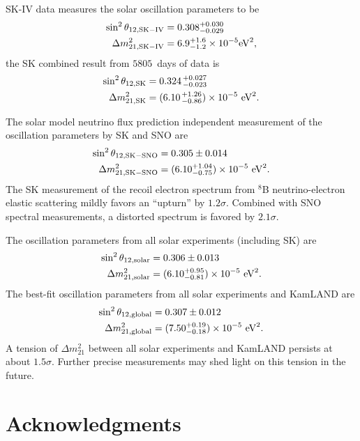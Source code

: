 \documentclass[aps,prd,reprint,superscriptaddress,floatfix,altaffilletter,nofootinbib]{revtex4-2}
\begin{document}
SK-IV data measures the solar oscillation parameters to be
\begin{align*}
    \sin^2\theta_{12,\rm{SK-IV}} & =0.308^{+0.030}_{-0.029}\\
    \Delta m^2_{21,\rm{SK-IV}}   & =6.9^{+1.6}_{-1.2}\times10^{-5}\rm{eV}^2,
\end{align*}
the SK combined result from $5805$~days of data is
\begin{align*}
  \sin^2\theta_{12,\rm{SK}} & = 0.324^{\, +0.027}_{\, -0.023} \\
  \Delta m^{2}_{21,\rm{SK}} & = (6.10 ^{\, +1.26}_{\, -0.86}) \times 10^{-5}~\rm{eV}^{2}.
\end{align*}

The solar model neutrino flux prediction independent measurement of the oscillation parameters by SK and SNO are
\begin{align*}
    \sin^2 \theta_{12,\rm{SK-SNO}} & = 0.305 \pm 0.014 \\
    \Delta m^{2}_{21,\rm{SK-SNO}} & = (6.10^{+ 1.04}_{-0.75})  \times 10^{-5}~\rm{eV}^{2}.
\end{align*}
The SK measurement of the recoil electron spectrum from $^8$B neutrino-electron elastic scattering mildly favors an ``upturn'' by $1.2\sigma.$ Combined with SNO spectral measurements, a distorted spectrum is favored by $2.1\sigma$.

The oscillation parameters from all solar experiments (including SK) are
\begin{align*}
    \sin^2 \theta_{12,\rm{solar}} & = 0.306 \pm 0.013 \\
    \Delta m^{2}_{21,\rm{solar}} & = (6.10^{+ 0.95}_{-0.81})  \times 10^{-5}~\rm{eV}^{2}.
\end{align*}
The best-fit oscillation parameters from all solar experiments and KamLAND are
\begin{align*}
\sin^2 \theta_{12,\rm{global}} & = 0.307\pm0.012 \\
\Delta m^{2}_{21,\rm{global}} & = (7.50^{+ 0.19}_{-0.18})  \times 10^{-5}~\rm{eV}^{2}.
\end{align*}
A tension of $\Delta m_{21}^2$ between all solar experiments and KamLAND persists at about $1.5\sigma$.
Further precise measurements may shed light on this tension in the future.


\section*{Acknowledgments}
\end{document}
